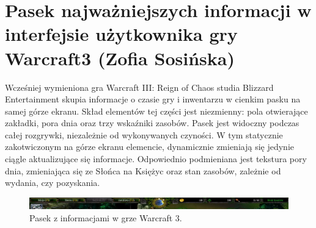 \section{Pasek najważniejszych informacji w interfejsie użytkownika gry Warcraft3 (Zofia Sosińska)}
Wcześniej wymieniona gra Warcraft III: Reign of Chaos studia Blizzard Entertainment skupia informacje o czasie gry i inwentarzu w cienkim pasku na samej górze ekranu.
Skład elementów tej części jest niezmienny: pola otwierające zakładki, pora dnia oraz trzy wskaźniki zasobów. Pasek jest widoczny
podczas całej rozgrywki, niezależnie od wykonywanych czyności. W tym statycznie zakotwiczonym na górze ekranu elemencie, dynamicznie
zmieniają się jedynie ciągle aktualizujące się informacje. Odpowiednio podmieniana jest tekstura pory dnia, zmieniająca się ze Słońca
na Księżyc oraz stan zasobów, zależnie od wydania, czy pozyskania.


\begin{figure}[htbp]
    \centering
    \includegraphics[width=1.0\textwidth]{images/ui/warcraft3_gorny_pasek.png}
    \caption{Pasek z informacjami w grze Warcraft 3.}\label{fig:Warcraft3}
\end{figure}